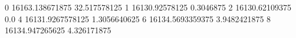 0 16163.138671875 32.517578125
1 16130.92578125 0.3046875
2 16130.62109375 0.0
4 16131.9267578125 1.3056640625
6 16134.5693359375 3.9482421875
8 16134.947265625 4.326171875
